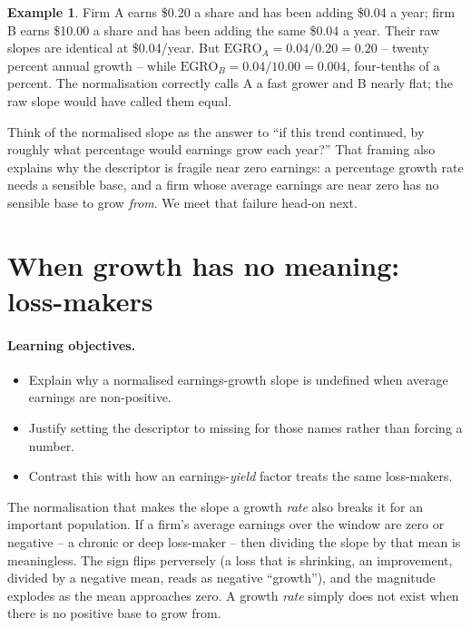 \documentclass[11pt]{article}
\theoremstyle{definition}
\newtheorem{example}{Example}[section]
\theoremstyle{plain}
\theoremstyle{remark}
\begin{document}
\begin{example}
Firm A earns \$0.20 a share and has been adding \$0.04 a year; firm B earns \$10.00 a share and has been adding the same \$0.04 a year. Their raw slopes are identical at \$0.04/year. But $\text{EGRO}_A = 0.04/0.20 = 0.20$ -- twenty percent annual growth -- while $\text{EGRO}_B = 0.04/10.00 = 0.004$, four-tenths of a percent. The normalisation correctly calls A a fast grower and B nearly flat; the raw slope would have called them equal.
\end{example}

\begin{intuition}
Think of the normalised slope as the answer to ``if this trend continued, by roughly what percentage would earnings grow each year?'' That framing also explains why the descriptor is fragile near zero earnings: a percentage growth rate needs a sensible base, and a firm whose average earnings are near zero has no sensible base to grow \emph{from}. We meet that failure head-on next.
\end{intuition}

\section{When growth has no meaning: loss-makers}\label{sec:lossmaker}

\paragraph{Learning objectives.}
\begin{itemize}[leftmargin=1.4em,topsep=2pt]
  \item Explain why a normalised earnings-growth slope is undefined when average earnings are non-positive.
  \item Justify setting the descriptor to missing for those names rather than forcing a number.
  \item Contrast this with how an earnings-\emph{yield} factor treats the same loss-makers.
\end{itemize}

The normalisation that makes the slope a growth \emph{rate} also breaks it for an important population. If a firm's average earnings over the window are zero or negative -- a chronic or deep loss-maker -- then dividing the slope by that mean is meaningless. The sign flips perversely (a loss that is shrinking, an improvement, divided by a negative mean, reads as negative ``growth''), and the magnitude explodes as the mean approaches zero. A growth \emph{rate} simply does not exist when there is no positive base to grow from.
\end{document}
